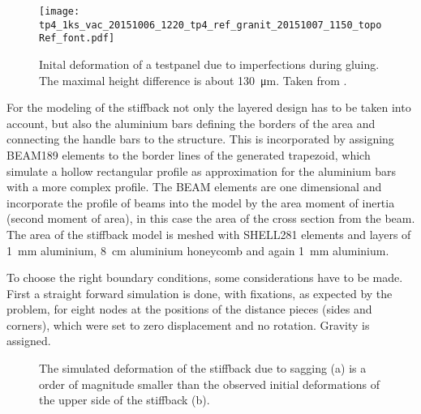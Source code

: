 \documentclass[
a4paper,                                %
twoside,                                %
BCOR1.4cm,                      %
10pt,                           %
headings=normal,                %
headsepline,                    %
clearplainpage, %
final,                                  %
div=14,
parskip=full,
openright,
bibliography=toc
]{scrreprt}
\begin{document}
\begin{figure}[H]
	\centering
	\texttt{[image: tp4\_1ks\_vac\_20151006\_1220\_tp4\_ref\_granit\_20151007\_1150\_topoRef\_font.pdf]}
	\caption{Inital deformation of a testpanel due to imperfections during gluing. The maximal height difference is about \SI{130}{\micro\m}. Taken from \cite{ralphMthesis}.}
	\label{panelInitialDeform}
\end{figure}

For the modeling of the stiffback not only the layered design has to be taken into account, but also the aluminium bars defining the borders of the area and connecting the handle bars to the structure. This is incorporated by assigning BEAM189 elements to the border lines of the generated trapezoid, which simulate a hollow rectangular profile as approximation for the aluminium bars with a more complex profile. The BEAM elements are one dimensional and incorporate the profile of beams into the model by the area moment of inertia (second moment of area), in this case the area of the cross section from the beam. The area of the stiffback model is meshed with SHELL281 elements and layers of \SI{1}{\mm} aluminium, \SI{8}{cm} aluminium honeycomb and again \SI{1}{\mm} aluminium.

To choose the right boundary conditions, some considerations have to be made. First a straight forward simulation is done, with fixations, as expected by the problem, for eight nodes at the positions of the distance pieces (sides and corners), which were set to zero displacement and no rotation. Gravity is assigned.

\begin{figure}[H]	
	\centering
	\qquad
	\caption{The simulated deformation of the stiffback due to sagging (a) is a order of magnitude smaller than the observed initial deformations of the upper side of the stiffback (b).}
	\label{nonComparableWithSim}
\end{figure}
\end{document}
